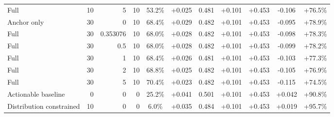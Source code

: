\begin{table}[htbp]
\begin{tabular}{lrrrccccccc}
Full & 10 & 5 & 10 & 53.2\% & +0.025 & 0.481 & +0.101 & +0.453 & -0.106 & +76.5\% \\
Anchor only & 30 & 0 & 10 & 68.4\% & +0.029 & 0.482 & +0.101 & +0.453 & -0.095 & +78.9\% \\
Full & 30 & 0.353076 & 10 & 68.0\% & +0.028 & 0.482 & +0.101 & +0.453 & -0.098 & +78.3\% \\
Full & 30 & 0.5 & 10 & 68.0\% & +0.028 & 0.482 & +0.101 & +0.453 & -0.099 & +78.2\% \\
Full & 30 & 1 & 10 & 68.4\% & +0.026 & 0.481 & +0.101 & +0.453 & -0.103 & +77.3\% \\
Full & 30 & 2 & 10 & 68.8\% & +0.025 & 0.482 & +0.101 & +0.453 & -0.105 & +76.9\% \\
Full & 30 & 5 & 10 & 70.4\% & +0.023 & 0.482 & +0.101 & +0.453 & -0.115 & +74.5\% \\
Actionable baseline & 0 & 0 & 0 & 25.2\% & +0.041 & 0.501 & +0.101 & +0.453 & +0.042 & +90.8\% \\
Distribution constrained & 10 & 0 & 0 & 6.0\% & +0.035 & 0.484 & +0.101 & +0.453 & +0.019 & +95.7\% \\
\bottomrule
\end{tabular}
\end{table}